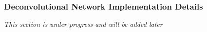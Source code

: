 \subsubsection{Deconvolutional Network Implementation Details}

\textit{This section is under progress and will be added later}

